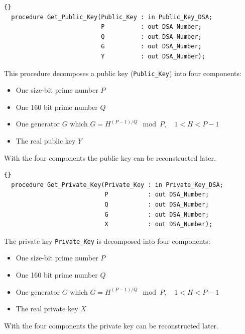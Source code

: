 \hhline
\begin{lstlisting}{}
  procedure Get_Public_Key(Public_Key : in Public_Key_DSA;
                           P          : out DSA_Number;
                           Q          : out DSA_Number;
                           G          : out DSA_Number;
                           Y          : out DSA_Number);
\end{lstlisting}
This procedure decomposes a public key (\texttt{Public\_Key}) into
four components:
\begin{itemize}
\item One size-bit prime number $P$
\item One 160 bit prime number $Q$
\item One generator $G$ which $G=H^{(P-1)/Q}\mod P,\quad 1<H<P-1$
\item The real public key $Y$
\end{itemize}
With the four components the public key can be reconstructed later.

\hhline
\begin{lstlisting}{}
  procedure Get_Private_Key(Private_Key : in Private_Key_DSA;
                            P           : out DSA_Number;
                            Q           : out DSA_Number;
                            G           : out DSA_Number;
                            X           : out DSA_Number);
\end{lstlisting}
The private key \texttt{Private\_Key} is decomposed into four components:
\begin{itemize}
\item One size-bit prime number $P$
\item One 160 bit prime number $Q$
\item One generator $G$ which $G=H^{(P-1)/Q}\mod P,\quad 1<H<P-1$
\item The real private key $X$
\end{itemize}
With the four components the private key can be reconstructed later.

